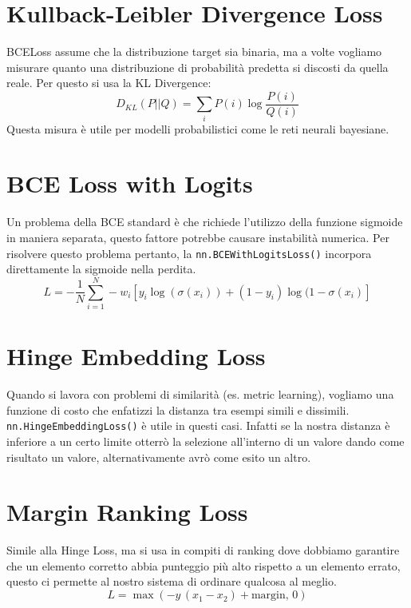 \section{Kullback-Leibler Divergence Loss}
BCELoss assume che la distribuzione target sia binaria, ma a volte vogliamo misurare quanto una distribuzione di probabilità predetta si discosti da quella reale. Per questo si usa la KL Divergence:
\begin{equation}
D_{KL}(P||Q) = \sum_{i} P(i) \log \frac{P(i)}{Q(i)}
\end{equation}
Questa misura è utile per modelli probabilistici come le reti neurali bayesiane.

\section{BCE Loss with Logits}
Un problema della BCE standard è che richiede l'utilizzo della funzione sigmoide in maniera separata, questo fattore potrebbe causare instabilità numerica. Per risolvere questo problema pertanto, la \texttt{nn.BCEWithLogitsLoss()} incorpora direttamente la sigmoide nella perdita.
\begin{equation}
    L = - \frac{1}{N} \sum_{i=1}^{N} -w_i\left[y_i \log(\sigma({x}_i)) + (1 - y_i) \log(1 - \sigma({x}_i) \right]
\end{equation}

\section{Hinge Embedding Loss}
Quando si lavora con problemi di similarità (es. metric learning), vogliamo una funzione di costo che enfatizzi la distanza tra esempi simili e dissimili. \texttt{nn.HingeEmbeddingLoss()} è utile in questi casi. Infatti se la nostra distanza è inferiore a un certo limite otterrò la selezione all'interno di un valore dando come risultato un valore, alternativamente avrò come esito un altro.

\section{Margin Ranking Loss}
Simile alla Hinge Loss, ma si usa in compiti di ranking dove dobbiamo garantire che un elemento corretto abbia punteggio più alto rispetto a un elemento errato, questo ci permette al nostro sistema di ordinare qualcosa al meglio.
\begin{equation}
    L = \max(-y\,(x_1-x_2)+\text{margin},\,0) 
\end{equation}

